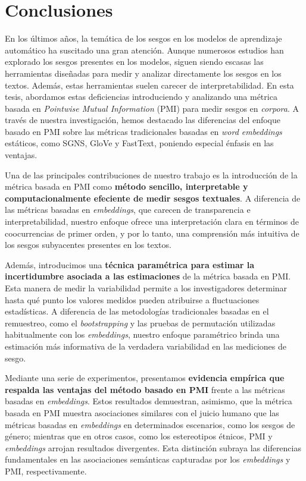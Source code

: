 
\chapter{Conclusiones} \label{cap:conclusiones}

En los últimos años, la temática de los sesgos en los modelos de aprendizaje automático ha suscitado una gran atención. Aunque numerosos estudios han explorado los sesgos presentes en los modelos, siguen siendo escasas las herramientas diseñadas para medir y analizar directamente los sesgos en los textos. Además, estas herramientas suelen carecer de interpretabilidad. En esta tesis, abordamos estas deficiencias introduciendo y analizando una métrica basada en \emph{Pointwise Mutual Information} (PMI) para medir sesgos en \emph{corpora}. A través de nuestra investigación, hemos destacado las diferencias del enfoque basado en PMI sobre las métricas tradicionales basadas en \emph{word embeddings} estáticos, como SGNS, GloVe y FastText, poniendo especial énfasis en las ventajas.


Una de las principales contribuciones de nuestro trabajo es la introducción de la métrica basada en PMI como \textbf{método sencillo, interpretable y computacionalmente efeciente de medir sesgos textuales}. A diferencia de las métricas basadas en \emph{embeddings}, que carecen de transparencia e interpretabilidad, nuestro enfoque ofrece una interpretación clara en términos de coocurrencias de primer orden, y por lo tanto, una comprensión más intuitiva de los sesgos subyacentes presentes en los textos.

Además, introducimos una \textbf{técnica paramétrica para estimar la incertidumbre asociada a las estimaciones} de la métrica basada en PMI. Esta manera de medir la variabilidad permite a los investigadores determinar hasta qué punto los valores medidos pueden atribuirse a fluctuaciones estadísticas. A diferencia de las metodologías tradicionales basadas en el remuestreo, como el \emph{bootstrapping} y las pruebas de permutación utilizadas habitualmente con los \emph{embeddings}, nuestro enfoque paramétrico brinda una estimación más informativa de la verdadera variabilidad en las mediciones de sesgo.

Mediante una serie de experimentos, presentamos \textbf{evidencia empírica que respalda las ventajas del método basado en PMI} frente a las métricas basadas en \emph{embeddings}. Estos resultados demuestran, asimismo, que la métrica basada en PMI muestra asociaciones similares con el juicio humano que las métricas basadas en \emph{embeddings} en determinados escenarios, como los sesgos de género; mientras que en otros casos, como los estereotipos étnicos, PMI y \emph{embeddings} arrojan resultados divergentes. Esta distinción subraya las diferencias fundamentales en las asociaciones semánticas capturadas por los \emph{embeddings} y PMI, respectivamente.

